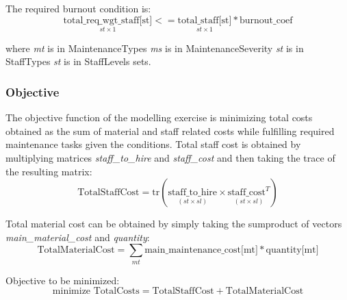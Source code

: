         The required burnout condition is:
        \begin{equation}
            \underset{st\times 1}{\text{total\_req\_wgt\_staff[st]}} <= 
                \underset{st\times 1}{\text{total\_staff[st]}} * \text{burnout\_coef}
        \end{equation}

        where \newline
            \hspace*{.75cm} \textit{mt} is in MaintenanceTypes \newline
            \hspace*{.75cm} \textit{ms} is in MaintenanceSeverity \newline
            \hspace*{.75cm} \textit{st} is in StaffTypes \newline
            \hspace*{.75cm} \textit{st} is in StaffLevels \newline
        \hspace*{.55cm}sets.

        \subsubsection{Objective}
        The objective function of the modelling exercise is minimizing total costs obtained as the 
        sum of material and staff related costs while fulfilling required maintenance tasks given 
        the conditions. Total staff cost is obtained by multiplying matrices 
        \textit{staff\_to\_hire} and \textit{staff\_cost} and then taking the trace of the resulting
        matrix:
        \[
            \text{TotalStaffCost} = 
            \text{tr}\left( \underset{(st \times sl)}{\text{staff\_to\_hire}} \times
            \underset{(st \times sl)}{\text{staff\_cost}^T}\right)
        \]

        Total material cost can be obtained by simply taking the sumproduct of vectors
        \textit{main\_material\_cost} and \textit{quantity}:
        \[
            \text{TotalMaterialCost} = 
            \sum_{mt}\text{main\_maintenance\_cost[mt]} * \text{quantity[mt]}
        \]

        Objective to be minimized:
        \begin{equation}
            \text{minimize TotalCosts} = 
                \text{TotalStaffCost} + \text{TotalMaterialCost}
        \end{equation}

